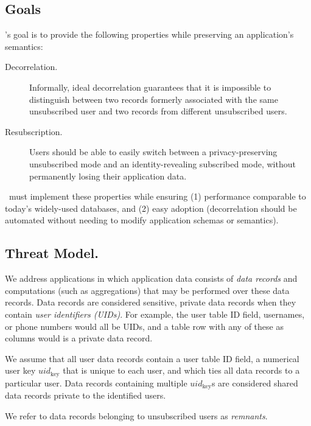 \subsection{Goals} 
\sys's goal is to provide the following properties while preserving an application's 
semantics: 
\begin{description} 
    \item[Decorrelation.] Informally, ideal decorrelation guarantees that it is impossible to distinguish
        between two records formerly associated with the same unsubscribed user and two records from
        different unsubscribed users.  
    \item[Resubscription.] Users should be able to easily switch between a privacy-preserving unsubscribed mode 
       and an identity-revealing subscribed mode, without permanently losing their application data.  
\end{description}

\sys~must implement these properties while ensuring (1) performance comparable to today’s
widely-used databases, and (2) easy adoption (decorrelation should be
automated without needing to modify application schemas or semantics).

\subsection{Threat Model.}
We address applications in which application data consists of \emph{data records} and computations
(such as aggregations) that may be performed over these data records. Data records are considered
sensitive, private data records when they contain \emph{user identifiers (UIDs)}. For example, the
user table ID field, usernames, or phone numbers would all be UIDs, and a table row with any of
these as columns would is a private data record. 

We assume that all user data records contain a user table ID field, a
numerical user key $uid_{\text{key}}$ that is unique to each user, and which ties all data records
to a particular user.
Data records containing multiple $uid_{\text{key}}$s are
considered shared data records private to the identified users. 

We refer to data records belonging
to unsubscribed users as \emph{remnants}.

